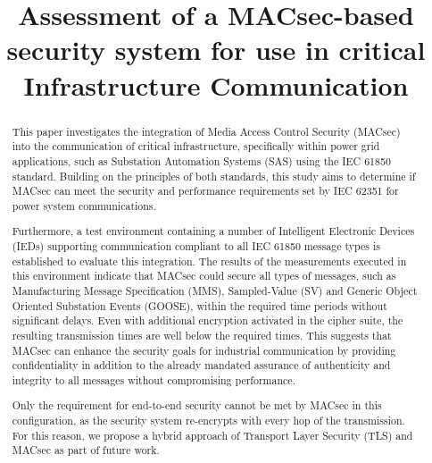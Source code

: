 \documentclass[conference, onecolumn, a4paper]{IEEEtran}
\begin{document}
\title{Assessment of a MACsec-based security system for use in critical Infrastructure Communication}

\author{
    \vspace{6 pt}
}

\maketitle

\begin{abstract}
    \noindent This paper investigates the integration of Media Access Control Security (MACsec) into the communication of critical infrastructure, 
    specifically within power grid applications, such as Substation Automation Systems (SAS) using the IEC 61850 standard. Building on the principles 
    of both standards, this study aims to determine if MACsec can meet the security and performance requirements set by IEC 62351 for power system 
    communications.
    
    \smallskip
    \noindent Furthermore, a  test environment containing a number of Intelligent Electronic Devices (IEDs) supporting communication compliant to all 
    IEC 61850 message types is established to evaluate this integration. The results of the measurements executed in this environment indicate that 
    MACsec could secure all types of messages, such as Manufacturing Message Specification (MMS), Sampled-Value (SV) and Generic Object Oriented 
    Substation Events (GOOSE), within the required time periods without significant delays. Even with additional encryption activated in the cipher suite, 
    the resulting transmission times are well below the required times. This suggests that MACsec can enhance the security goals for industrial 
    communication by providing confidentiality in addition to the already mandated assurance of authenticity and integrity to all messages without 
    compromising performance.

    \smallskip
    \noindent Only the requirement for end-to-end security cannot be met by MACsec in this configuration, as the security system re-encrypts with every 
    hop of the transmission. For this reason, we propose a hybrid approach of Transport Layer Security (TLS) and MACsec as part of future work. 
\end{abstract}
\end{document}
